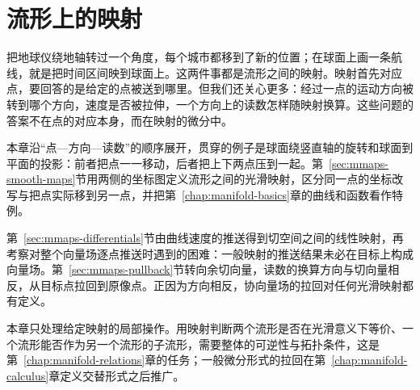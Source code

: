 \chapter{流形上的映射}
\label{chap:manifold-maps}

把地球仪绕地轴转过一个角度，每个城市都移到了新的位置；在球面上画一条航线，就是把时间区间映到球面上。这两件事都是流形之间的映射。映射首先对应点，要回答的是给定的点被送到哪里。但我们还关心更多：经过一点的运动方向被转到哪个方向，速度是否被拉伸，一个方向上的读数怎样随映射换算。这些问题的答案不在点的对应本身，而在映射的微分中。

本章沿“点—方向—读数”的顺序展开，贯穿的例子是球面绕竖直轴的旋转和球面到平面的投影：前者把点一一移动，后者把上下两点压到一起。第~\ref{sec:mmaps-smooth-maps}节用两侧的坐标图定义流形之间的光滑映射，区分同一点的坐标改写与把点实际移到另一点，并把第~\ref{chap:manifold-basics}章的曲线和函数看作特例。

第~\ref{sec:mmaps-differentials}节由曲线速度的推送得到切空间之间的线性映射，再考察对整个向量场逐点推送时遇到的困难：一般映射的推送结果未必在目标上构成向量场。第~\ref{sec:mmaps-pullback}节转向余切向量，读数的换算方向与切向量相反，从目标点拉回到原像点。正因为方向相反，协向量场的拉回对任何光滑映射都有定义。

本章只处理给定映射的局部操作。用映射判断两个流形是否在光滑意义下等价、一个流形能否作为另一个流形的子流形，需要整体的可逆性与拓扑条件，这是第~\ref{chap:manifold-relations}章的任务；一般微分形式的拉回在第~\ref{chap:manifold-calculus}章定义交替形式之后推广。





